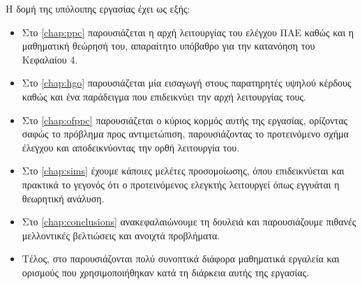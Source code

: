 Η δομή της υπόλοιπης εργασίας έχει ως εξής:
\begin{itemize}
    \item Στο \cref{chap:ppc} παρουσιάζεται η αρχή λειτουργίας του ελέγχου ΠΑΕ καθώς και η μαθηματική θεώρησή του, απαραίτητο υπόβαθρο για την κατανόηση του Κεφαλαίου 4.
    \item Στο \cref{chap:hgo} παρουσιάζεται μία εισαγωγή στους παρατηρητές υψηλού κέρδους καθώς και ένα παράδειγμα που επιδεικνύει την αρχή λειτουργίας τους.
    \item Στο \cref{chap:ofppc} παρουσιάζεται ο κύριος κορμός αυτής της εργασίας, ορίζοντας σαφώς το πρόβλημα προς αντιμετώπιση, παρουσιάζοντας το προτεινόμενο σχήμα έλεγχου και αποδεικνύοντας την ορθή λειτουργία του.
    \item Στο \cref{chap:sims} έχουμε κάποιες μελέτες προσομοίωσης, όπου επιδεικνύεται και πρακτικά το γεγονός ότι ο προτεινόμενος ελεγκτής λειτουργεί όπως εγγυάται η θεωρητική ανάλυση.
    \item Στο \cref{chap:conclusions} ανακεφαλαιώνουμε τη δουλειά και παρουσιάζουμε πιθανές μελλοντικές βελτιώσεις και ανοιχτά προβλήματα.
    \item Τέλος, στο  παρουσιάζονται πολύ συνοπτικά διάφορα μαθηματικά εργαλεία και ορισμούς που χρησιμοποιήθηκαν κατά τη διάρκεια αυτής της εργασίας.
\end{itemize}

